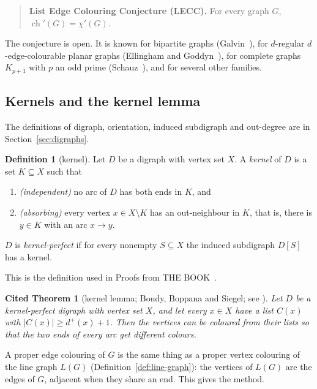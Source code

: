 \documentclass[11pt]{article}
\theoremstyle{plain}
\newtheorem{citedtheorem}[theorem]{Cited Theorem}
\theoremstyle{definition}
\newtheorem{definition}[theorem]{Definition}
\theoremstyle{remark}
\newcommand{\LG}{L(G)}
\newcommand{\dout}{d^{+}}
\newcommand{\chil}{\operatorname{ch}'}
\newcommand{\chie}{\chi'}
\begin{document}
\begin{quote}
\textbf{List Edge Colouring Conjecture (LECC).} For every graph $G$, $\chil(G)=\chie(G)$.
\end{quote}

The conjecture is open. It is known for bipartite graphs (Galvin~\cite{galvin}), for $d$-regular
$d$-edge-colourable planar graphs (Ellingham and Goddyn~\cite{eg}), for complete graphs $K_{p+1}$
with $p$ an odd prime (Schauz~\cite{schauz14}), and for several other families.

\subsection{Kernels and the kernel lemma}

The definitions of digraph, orientation, induced subdigraph and out-degree are in
Section~\ref{sec:digraphs}.

\begin{definition}[kernel]\label{def:kernel-intro}
Let $D$ be a digraph with vertex set $X$. A \emph{kernel} of $D$ is a set $K\subseteq X$ such
that
\begin{enumerate}[label=(K\arabic*)]
  \item \emph{(independent)} no arc of $D$ has both ends in $K$, and
  \item \emph{(absorbing)} every vertex $x\in X\setminus K$ has an out-neighbour in $K$, that is,
    there is $y\in K$ with an arc $x\to y$.
\end{enumerate}
$D$ is \emph{kernel-perfect} if for every nonempty $S\subseteq X$ the induced subdigraph $D[S]$
has a kernel.
\end{definition}

This is the definition used in Proofs from THE BOOK~\cite[Chapter~33, Definition~1]{book}.

\begin{citedtheorem}[kernel lemma; Bondy, Boppana and Siegel; see {\cite[Chapter~33, Lemma~1]{book}}]\label{thm:kernel-lemma}
Let $D$ be a kernel-perfect digraph with vertex set $X$, and let every $x\in X$ have a list
$C(x)$ with $|C(x)|\ge \dout(x)+1$. Then the vertices can be coloured from their lists so that
the two ends of every arc get different colours.
\end{citedtheorem}

A proper edge colouring of $G$ is the same thing as a proper vertex colouring of the line graph
$\LG$ (Definition~\ref{def:line-graph}): the vertices of $\LG$ are the edges of $G$, adjacent
when they share an end. This gives the method.
\end{document}
